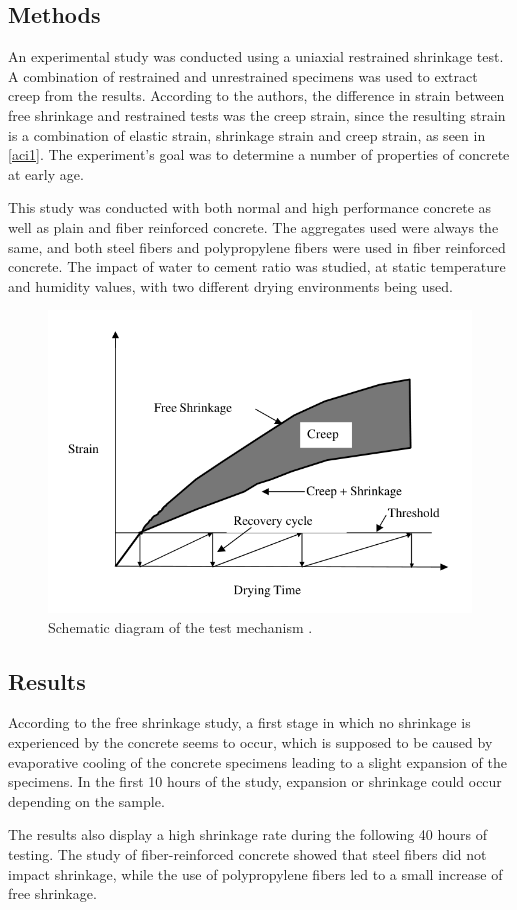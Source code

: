 \documentclass[a4paper,11pt]{memoir}
\begin{document}
\subsection{Methods}
An experimental study was conducted using a uniaxial restrained shrinkage test.
A combination of restrained and unrestrained specimens was used to extract
creep from the results. According to the authors, the difference in strain
between free shrinkage and restrained tests was the creep strain, since the
resulting strain is a combination of elastic strain, shrinkage strain and creep
strain, as seen in
\autoref{aci1}. The experiment's goal was to determine a number of properties
of concrete at early age.

This study was conducted with both normal and high performance concrete as
well as plain and fiber reinforced concrete. The aggregates used were always
the same, and both steel fibers and polypropylene fibers were used in fiber
reinforced concrete. The impact of water to cement ratio was studied, at
static temperature and humidity values, with two different drying environments
being used.

\begin{figure}
  \centering
  \includegraphics[width=.5\linewidth]{aci1}
  \caption{Schematic diagram of the test mechanism \cite{cscea}.}\label{aci1}
\end{figure}

\subsection{Results}
According to the free shrinkage study, a first stage in which no shrinkage is
experienced by the concrete seems to occur, which is supposed to be caused by
evaporative cooling of the concrete specimens leading to a slight expansion of
the specimens. In the first 10 hours of the study, expansion or shrinkage could
occur depending on the sample.

The results also display a high shrinkage rate during the following 40 hours of
testing. The study of fiber-reinforced concrete showed that steel fibers did
not impact shrinkage, while the use of polypropylene fibers led to a small
increase of free shrinkage.
\end{document}
